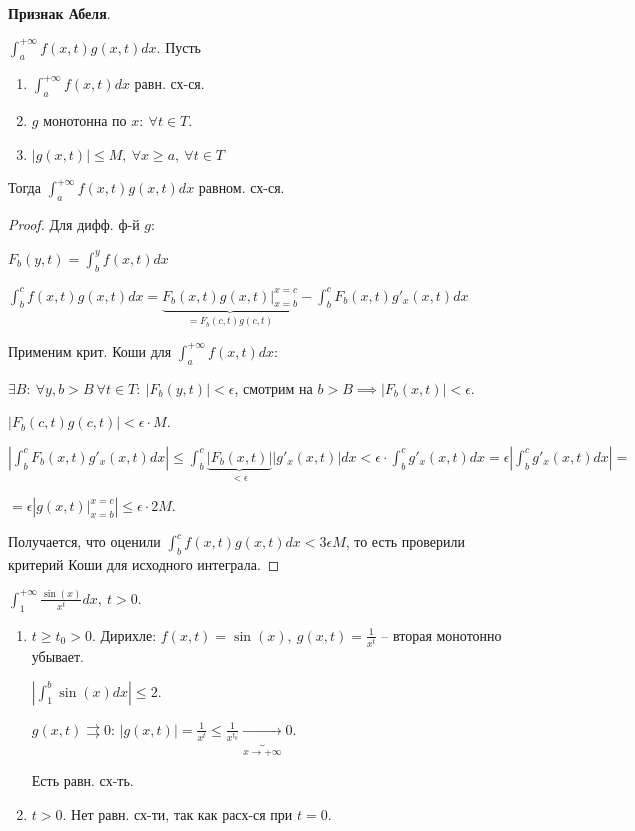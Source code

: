 \begin{theorem}
    \textbf{Признак Абеля}.

    $\int_{a}^{+\infty} { f(x, t) g(x, t) dx }$. Пусть 
    
    \begin{enumerate}
        \item {
            $\int_{a}^{+\infty} { f(x, t) dx }$ равн. сх-ся.
        }
        \item {
            $g$ монотонна по $x: \ \forall t \in T$. 
        }
        \item {
            $| g(x, t) | \leq M, \ \forall x \geq a, \ \forall t \in T$
        }
    \end{enumerate}

    Тогда $\int_{a}^{+\infty} { f(x, t) g(x, t) dx }$ равном. сх-ся.
\end{theorem}
\begin{proof}
    Для дифф. ф-й $g$:

    $F_b (y, t) = \int_{b}^{y} { f(x, t) dx }$

    $\int_{b}^{c} { f(x, t) g(x, t) dx } = \underbrace{F_b (x, t) g(x, t) |_{x=b}^{x=c}}_{= F_b(c, t) g(c, t)} - \int_b^{c} { F_b(x, t) g'_x(x, t) dx }$

    Применим крит. Коши для $\int_{a}^{+\infty} {f(x, t) dx}$:
    
    $\exists B : \ \forall y, b > B \ \forall t \in T: \ \left| F_b(y, t)  \right| < \epsilon$, смотрим на $b > B \implies |F_b(x, t)| < \epsilon$.

    $|F_b(c, t) g(c, t)| < \epsilon \cdot M$.

    $\left| \int_{b}^{c} { F_b(x, t) g'_x(x, t) dx } \right| \leq \int_{b}^{c} { \underbrace{|F_b(x, t)|}_{< \epsilon} |g'_x(x, t)| dx} < \epsilon \cdot \int_{b}^{c} { g'_x(x, t) dx } = \epsilon \left| \int_{b}^{c} { g'_x(x, t) d x } \right| =$
    
    $= \epsilon \left| g(x, t)|_{x=b}^{x=c}  \right| \leq \epsilon \cdot 2 M$.

    Получается, что оценили $\int_{b}^{c} { f(x, t) g(x, t) dx } < 3 \epsilon M$, то есть проверили критерий Коши для исходного интеграла.
\end{proof}
\begin{example}
    $\int_{1}^{+\infty} { \frac{\sin(x)}{x^t} dx }, \ t > 0$.

    \begin{enumerate}
        \item {
            $t \geq t_0 > 0$. Дирихле: $f(x, t) = \sin(x), \ g(x, t) = \frac{1}{x^t}$ -- вторая монотонно убывает.

            $\left| \int_{1}^{b} { \sin(x) dx } \right| \leq 2$.

            $g(x, t) \rightrightarrows 0$: $|g(x, t)| = \frac{1}{x^t} \leq \frac{1}{x^{t_0}} \underbrace{\rightarrow}_{x \rightarrow +\infty} 0$.

            Есть равн. сх-ть.
        }
        \item {
            $t > 0$. Нет равн. сх-ти, так как расх-ся при $t=0$.
        }
    \end{enumerate}
\end{example}

